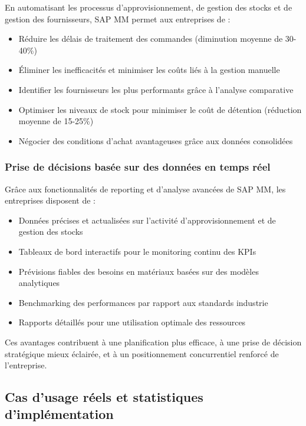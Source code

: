\documentclass[12pt,a4paper,oneside]{report}
\begin{document}
En automatisant les processus d'approvisionnement, de gestion des stocks et de gestion des fournisseurs, SAP MM permet 
aux entreprises de :

\begin{itemize}[label=\textbullet, itemsep=0.2em]
	\item Réduire les délais de traitement des commandes (diminution moyenne de 30-40\%)
	\item Éliminer les inefficacités et minimiser les coûts liés à la gestion manuelle
	\item Identifier les fournisseurs les plus performants grâce à l'analyse comparative
	\item Optimiser les niveaux de stock pour minimiser le coût de détention (réduction moyenne de 15-25\%)
	\item Négocier des conditions d'achat avantageuses grâce aux données consolidées
\end{itemize}

\subsubsection{Prise de décisions basée sur des données en temps réel}\label{ch2:mm-decision}

Grâce aux fonctionnalités de reporting et d'analyse avancées de SAP MM, les entreprises disposent de :

\begin{itemize}[label=---, itemsep=0.15em]
	\item Données précises et actualisées sur l'activité d'approvisionnement et de gestion des stocks
	\item Tableaux de bord interactifs pour le monitoring continu des KPIs
	\item Prévisions fiables des besoins en matériaux basées sur des modèles analytiques
	\item Benchmarking des performances par rapport aux standards industrie
	\item Rapports détaillés pour une utilisation optimale des ressources
\end{itemize}

Ces avantages contribuent à une planification plus efficace, à une prise de décision stratégique mieux éclairée, 
et à un positionnement concurrentiel renforcé de l'entreprise.

\subsection{Cas d'usage réels et statistiques d'implémentation}\label{ch2:mm-casusage}
\end{document}
